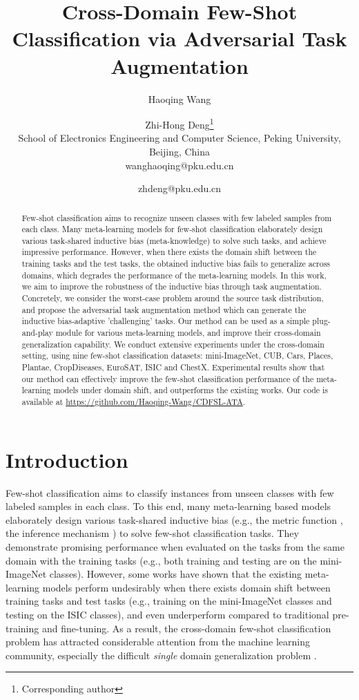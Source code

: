 \documentclass{article}
\title{Cross-Domain Few-Shot Classification via Adversarial Task Augmentation}
\author{
Haoqing Wang\and
Zhi-Hong Deng\footnote{Corresponding author}\\
\affiliations
School of Electronics Engineering and Computer Science, Peking University, Beijing, China\\
\emails
wanghaoqing@pku.edu.cn\and
zhdeng@pku.edu.cn
}
\begin{document}
\maketitle

\begin{abstract}
Few-shot classification aims to recognize unseen classes with few labeled samples from each class. Many meta-learning models for few-shot classification elaborately design various task-shared inductive bias (meta-knowledge) to solve such tasks, and achieve impressive performance. However, when there exists the domain shift between the training tasks and the test tasks, the obtained inductive bias fails to generalize across domains, which degrades the performance of the meta-learning models. In this work, we aim to improve the robustness of the inductive bias through task augmentation. Concretely, we consider the worst-case problem around the source task distribution, and propose the adversarial task augmentation method which can generate the inductive bias-adaptive 'challenging' tasks. Our method can be used as a simple plug-and-play module for various meta-learning models, and improve their cross-domain generalization capability. We conduct extensive experiments under the cross-domain setting, using nine few-shot classification datasets: mini-ImageNet, CUB, Cars, Places, Plantae, CropDiseases, EuroSAT, ISIC and ChestX. Experimental results show that our method can effectively improve the few-shot classification performance of the meta-learning models under domain shift, and outperforms the existing works. Our code is available at \url{https://github.com/Haoqing-Wang/CDFSL-ATA}.
\end{abstract}

\section{Introduction}
Few-shot classification \cite{lake2015human} aims to classify instances from unseen classes with few labeled samples in each class. To this end, many meta-learning based models elaborately design various task-shared inductive bias (e.g., the metric function \cite{sung2018learning}, the inference mechanism \cite{garcia2018few,liu2019learning}) to solve few-shot classification tasks. They demonstrate promising performance when evaluated on the tasks from the same domain with the training tasks (e.g., both training and testing are on the mini-ImageNet classes). However, some works \cite{DBLP:conf/iclr/ChenLKWH19,guo2020broader} have shown that the existing meta-learning models perform undesirably when there exists domain shift between training tasks and test tasks (e.g., training on the mini-ImageNet classes and testing on the ISIC classes), and even underperform compared to traditional pre-training and fine-tuning. As a result, the cross-domain few-shot classification problem has attracted considerable attention from the machine learning community, especially the difficult \emph{single} domain generalization problem \cite{DBLP:conf/iclr/TsengLH020,guo2020broader}.
\end{document}
